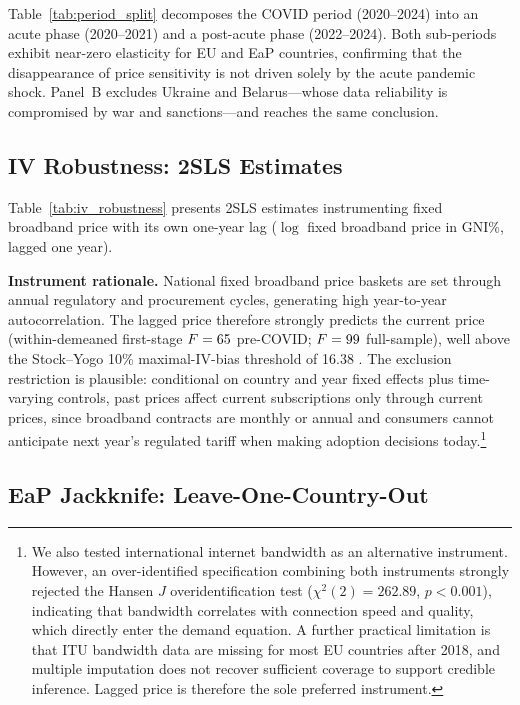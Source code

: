 \documentclass[preprint,review,12pt,authoryear]{styles/elsarticle}
\begin{document}
Table~\ref{tab:period_split} decomposes the COVID period (2020--2024) into an
acute phase (2020--2021) and a post-acute phase (2022--2024). Both sub-periods
exhibit near-zero elasticity for EU and EaP countries, confirming that the
disappearance of price sensitivity is not driven solely by the acute pandemic shock.
Panel~B excludes Ukraine and Belarus---whose data reliability is compromised by war
and sanctions---and reaches the same conclusion.


\clearpage

\subsection{IV Robustness: 2SLS Estimates}
\small
\singlespacing

Table~\ref{tab:iv_robustness} presents 2SLS estimates instrumenting fixed broadband
price with its own one-year lag ($\log$ fixed broadband price in GNI\%, lagged one year).

\textbf{Instrument rationale.}
National fixed broadband price baskets are set through annual regulatory and
procurement cycles, generating high year-to-year autocorrelation. The lagged price
therefore strongly predicts the current price (within-demeaned first-stage
$F = 65$ pre-COVID; $F = 99$ full-sample), well above the Stock--Yogo
10\% maximal-IV-bias threshold of 16.38 \citep{stock2002testing}. The exclusion
restriction is plausible: conditional on country and year fixed effects plus
time-varying controls, past prices affect current subscriptions only through current
prices, since broadband contracts are monthly or annual and consumers cannot anticipate
next year's regulated tariff when making adoption decisions today.\footnote{We also
tested international internet bandwidth as an alternative instrument. However, an
over-identified specification combining both instruments strongly rejected the Hansen
$J$ overidentification test ($\chi^{2}(2) = 262.89$, $p < 0.001$), indicating that
bandwidth correlates with connection speed and quality, which directly enter the demand
equation. A further practical limitation is that ITU bandwidth data are missing for most
EU countries after 2018, and multiple imputation does not recover sufficient coverage to
support credible inference. Lagged price is therefore the sole preferred instrument.}


\clearpage

\subsection{EaP Jackknife: Leave-One-Country-Out}
\end{document}
